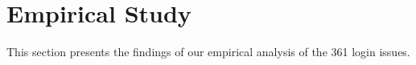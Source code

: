 \section{Empirical Study}
This section presents the findings of our empirical analysis of the 361 login issues.





